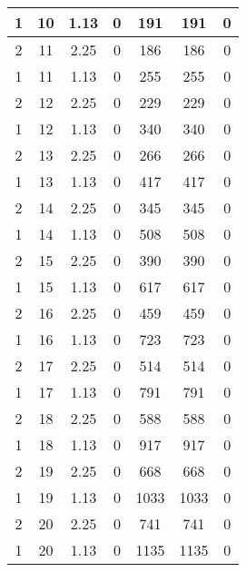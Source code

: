 \documentclass[letterpaper, 12pt]{article}
\begin{document}
\begin{longtable}{|c|c|c|c|c|c|c|}
\hline
1 & 10 & 1.13 & 0 & 191 & 191 & 0 \\
\hline
2 & 11 & 2.25 & 0 & 186 & 186 & 0 \\
\hline
1 & 11 & 1.13 & 0 & 255 & 255 & 0 \\
\hline
2 & 12 & 2.25 & 0 & 229 & 229 & 0 \\
\hline
1 & 12 & 1.13 & 0 & 340 & 340 & 0 \\
\hline
2 & 13 & 2.25 & 0 & 266 & 266 & 0 \\
\hline
1 & 13 & 1.13 & 0 & 417 & 417 & 0 \\
\hline
2 & 14 & 2.25 & 0 & 345 & 345 & 0 \\
\hline
1 & 14 & 1.13 & 0 & 508 & 508 & 0 \\
\hline
2 & 15 & 2.25 & 0 & 390 & 390 & 0 \\
\hline
1 & 15 & 1.13 & 0 & 617 & 617 & 0 \\
\hline
2 & 16 & 2.25 & 0 & 459 & 459 & 0 \\
\hline
1 & 16 & 1.13 & 0 & 723 & 723 & 0 \\
\hline
2 & 17 & 2.25 & 0 & 514 & 514 & 0 \\
\hline
1 & 17 & 1.13 & 0 & 791 & 791 & 0 \\
\hline
2 & 18 & 2.25 & 0 & 588 & 588 & 0 \\
\hline
1 & 18 & 1.13 & 0 & 917 & 917 & 0 \\
\hline
2 & 19 & 2.25 & 0 & 668 & 668 & 0 \\
\hline
1 & 19 & 1.13 & 0 & 1033 & 1033 & 0 \\
\hline
2 & 20 & 2.25 & 0 & 741 & 741 & 0 \\
\hline
1 & 20 & 1.13 & 0 & 1135 & 1135 & 0 \\
\hline
\end{longtable}
\end{document}
